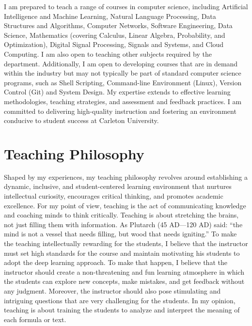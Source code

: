 \documentclass[11pt]{article}
\begin{document}
I am prepared to teach a range of courses in computer science, including Artificial Intelligence and Machine Learning, Natural Language Processing, Data Structures and Algorithms, Computer Networks, Software Engineering, Data Science, Mathematics (covering Calculus, Linear Algebra, Probability, and Optimization), Digital Signal Processing, Signals and Systems, and Cloud Computing. I am also open to teaching other subjects required by the department. Additionally, I am open to developing courses that are in demand within the industry but may not typically be part of standard computer science programs, such as Shell Scripting, Command-line Environment (Linux), Version Control (Git) and System Design.
My expertise extends to effective learning methodologies, teaching strategies, and assessment and feedback practices. I am committed to delivering high-quality instruction and fostering an environment conducive to student success at Carleton University. %


\section{Teaching Philosophy}
Shaped by my experiences, my teaching philosophy revolves around establishing a dynamic, inclusive, and student-centered learning environment that nurtures intellectual curiosity, encourages critical thinking, and promotes academic excellence.
For my point of view, teaching is the act of communicating knowledge and coaching minds to think critically. Teaching is about stretching the brains, not just filling them with information. As Plutarch (45 AD---120 AD) said: ``the mind is not a vessel that needs filling, but wood that needs igniting.'' To make the teaching intellectually rewarding for the students, I believe that the instructor must set high standards for the course and maintain motivating his students to adopt the deep learning approach. To make that happen, I believe that the instructor should create a non-threatening and fun learning atmosphere in which the students can explore new concepts, make mistakes, and get feedback without any judgment. Moreover, the instructor should also pose stimulating and intriguing questions that are very challenging for the students. In my opinion, teaching is about training the students to analyze and interpret the meaning of each formula or text. 
\end{document}
